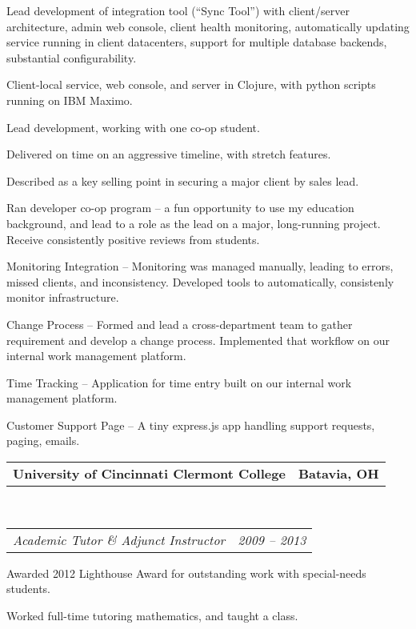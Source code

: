 \documentclass[10pt,letterpaper]{article}
\makeatletter
\newcommand{\headerrow}[2]
{\begin{tabular*}{\linewidth}{l@{\extracolsep{\fill}}r}
	#1 &
	#2 \\
\end{tabular*}}
\makeatother
\begin{document}
\begin{itemize*}
	\item Lead development of integration tool (``Sync Tool'') with client/server architecture, admin web console, client health monitoring, automatically updating service running in client datacenters, support for multiple database backends, substantial configurability.
          \begin{itemize*}
          \item Client-local service, web console, and server in Clojure, with python scripts running on IBM Maximo.
          \item Lead development, working with one co-op student.
          \item Delivered on time on an aggressive timeline, with stretch features.
          \item Described as a key selling point in securing a major client by sales lead.
          \end{itemize*}

          \item Ran developer co-op program -- a fun opportunity to use my education background, and lead to a role as the lead on a major, long-running project.  Receive consistently positive reviews from students.
          \item Monitoring Integration -- Monitoring was managed manually, leading to errors, missed clients, and inconsistency.  Developed tools to automatically, consistenly monitor infrastructure.
          \item Change Process -- Formed and lead a cross-department team to gather requirement and develop a change process.  Implemented that workflow on our internal work management platform.
          \item Time Tracking -- Application for time entry built on our internal work management platform.
          \item Customer Support Page -- A tiny express.js app handling support requests, paging, emails.

	\end{itemize*}
\headerrow
    {\textbf{University of Cincinnati Clermont College}}
    {\textbf{Batavia, OH}}
    \\
    \headerrow
	{\emph{Academic Tutor \& Adjunct Instructor}}
	{\emph{2009 -- 2013}}
	\begin{itemize*}
	\item Awarded 2012 Lighthouse Award for outstanding work with special-needs students.
	\item Worked full-time tutoring mathematics, and taught a class.
	\end{itemize*}
\end{document}

